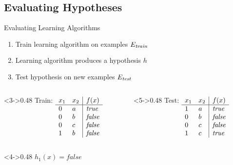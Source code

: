 \documentclass[14pt]{beamer}
\begin{document}
\subsection{Evaluating Hypotheses}

\begin{frame}[label=evaluating-ml]{Evaluating Learning Algorithms}
\begin{enumerate}
\item Train learning algorithm on examples $E_{\textit{\scriptsize train}}$
\item Learning algorithm produces a hypothesis $h$
\item Test hypothesis on new examples $E_{\textit{\scriptsize test}}$ 
\end{enumerate}
\begin{columns}
\begin{column}<3->{0.48\textwidth}
Train:
$
\begin{array}[t]{ll|l}
x_1 & x_2 & f(x) \\
\hline
0   & a   & \textit{true} \\
0   & b   & \textit{false} \\
0   & c   & \textit{false} \\
1   & b   & \textit{false} \\
\end{array}
$
\end{column}
\begin{column}<5->{0.48\textwidth}
Test:
$
\begin{array}[t]{ll|l}
x_1 & x_2 & f(x) \\
\hline
1   & a   & \textit{true} \\
0   & b   & \textit{false} \\
0   & c   & \textit{false} \\
1   & c   & \textit{true} \\
\end{array}
$
\end{column}
\end{columns}
\medskip
\begin{columns}
\begin{column}<4->{0.48\textwidth}
$\displaystyle h_1(x) = \textit{false} $ \\
\end{column}
\end{columns}
\end{frame}
\end{document}
